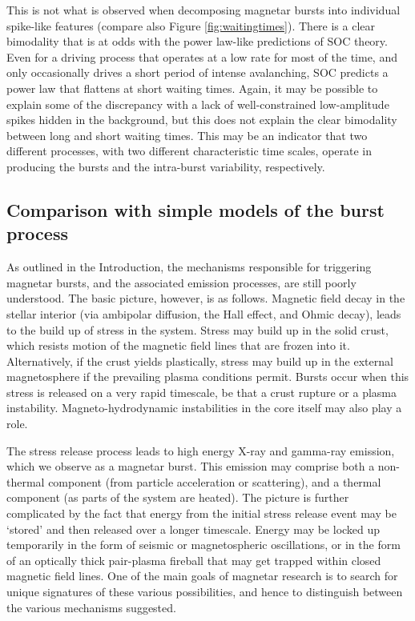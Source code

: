 \documentclass[12pt]{emulateapj}
\begin{document}
This is not what is observed when decomposing magnetar bursts into individual spike-like features (compare also Figure \ref{fig:waitingtimes}). There is a
clear bimodality that is at odds with the power law-like predictions of SOC theory. Even for a driving process that operates at a low
rate for most of the time, and only occasionally drives a short period of intense avalanching, SOC predicts a power law that flattens at short
waiting times. Again, it may be possible to explain some of the discrepancy with a lack of well-constrained low-amplitude spikes hidden in 
the background, but this does not explain the clear bimodality between long and short waiting times. This may be an indicator that two different
processes, with two different characteristic time scales, operate in producing the bursts and the intra-burst variability, respectively. 


\subsection{Comparison with simple models of the burst process}
As outlined in the Introduction, the mechanisms responsible for triggering magnetar bursts, and the associated emission processes,
 are still poorly understood. The basic picture, however, is as follows. Magnetic field decay in the stellar interior (via ambipolar diffusion, 
 the Hall effect, and Ohmic decay), leads to the build up of stress in the system. Stress may build up in the solid crust, which resists motion of the 
 magnetic field lines that are frozen into it. Alternatively, if the crust yields plastically, stress may build up in the external magnetosphere if the 
 prevailing plasma conditions permit. Bursts occur when this stress is released on a very rapid timescale, be that a crust rupture or a plasma instability. 
 Magneto-hydrodynamic instabilities in the core itself may also play a role.

The stress release process leads to high energy X-ray and gamma-ray emission, which we observe as a magnetar burst. This emission may comprise 
both a non-thermal component (from particle acceleration or scattering), and a thermal component (as parts of the system are heated). The picture is 
further complicated by the fact that energy from the initial stress release event may be `stored' and then released over a longer timescale. Energy may 
be locked up temporarily in the form of seismic or magnetospheric oscillations, or in the form of an optically thick pair-plasma fireball that may get trapped
 within closed magnetic field lines. One of the main goals of magnetar research is to search for unique signatures of these various possibilities, and hence 
 to distinguish between the various mechanisms suggested.
\end{document}
